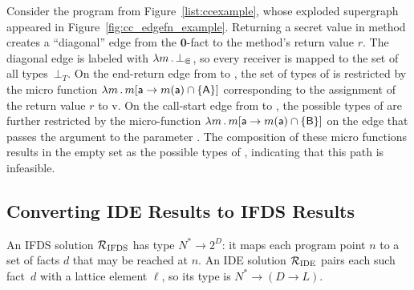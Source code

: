\begin{example}
  Consider the program from Figure~\ref{list:ccexample}, whose exploded supergraph appeared in Figure~\ref{fig:cc_edgefn_example}.
%
  Returning a secret value in method  creates a ``diagonal'' edge from the $\mathbf0$-fact to the method's return value $r$. 
  The diagonal edge is labeled with $\lambda m\,.\,\bot_\Subset$, so every receiver is mapped to the set of all types~$\bot_T$.
%  
On the end-return edge from  to , the set of types of  is restricted by the micro function $\lambda m\,.\,m[\textsf{a}\to m(\textsf{a})\cap\{\textsf{A}\}]$ corresponding to the assignment of the return value $r$ to \code v.
%
On the call-start edge from  to , the possible types
of  are further restricted by the micro-function
$\lambda m\,.\,m[\textsf{a}\to m(\textsf{a})\cap\{\textsf{B}\}]$
on the edge that passes the argument  to the parameter .
The composition of these micro functions results in the empty set as the possible
types of , indicating that this
path 
is 
infeasible.
\end{example}




\subsection{Converting IDE Results to IFDS Results}\label{sec:ideToIfds}

An IFDS solution $\mathcal R_{\text{IFDS}}$ has type $N^* \to 2^D$: it maps each program point $n$
to a set of facts $d$ that may be reached at $n$.
An IDE solution $\mathcal R_{\text{IDE}}$
pairs each such fact~$d$ with a lattice element $\ell$, so its type
is $N^* \to (D \to L)$.

